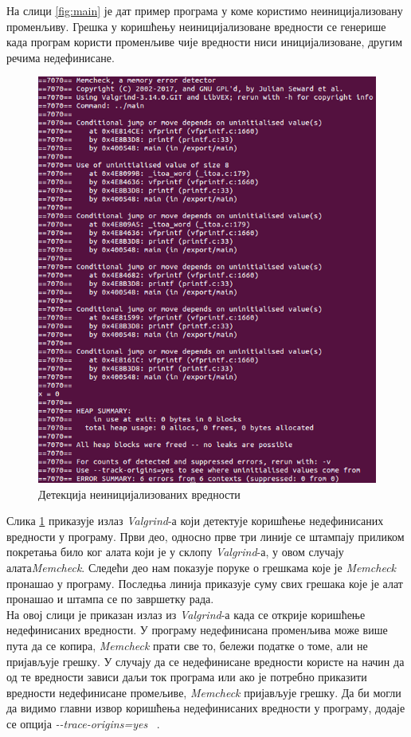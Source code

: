 \documentclass[12pt,oneside]{memoir}
\begin{document}
\indent На слици \ref{fig:main} је дат пример програма у коме користимо неиницијализовану променљиву. Грешка у коришћењу неиницијализоване вредности се генерише када програм користи променљиве чије вредности ниси иницијализоване, другим речима недефинисане.

\begin{figure}[h!]
\begin{center}
\includegraphics[scale=0.75]{slika2.png}
\end{center}
\caption{Детекција неиницијализованих вредности}
\label{fig:memcheck}
\end{figure}

\indent Слика \ref{fig:memcheck} приказује излаз \textit{Valgrind}-а који детектује коришћење недефинисаних вредности у програму. Први део, односно прве три линије се штампају приликом покретања било ког алата који је у склопу \textit{Valgrind}-а, у овом случају алата\textit{Memcheck}. Следећи део нам показује поруке о грешкама које је \textit{Memcheck} пронашао у програму. Последња линија приказује суму свих грешака које је алат пронашао и штампа се по завршетку рада. \\
\indent На овој слици је приказан излаз из \textit{Valgrind}-а када се открије  коришћење недефинисаних вредности. У програму недефинисана променљива може више пута да се копира, \textit{Memcheck} прати све то, бележи податке о томе, али не пријављује грешку. У случају да се недефинисане вредности користе на начин да од те вредности зависи даљи ток програма или ако је потребно приказити вредности недефинисане промељиве, \textit{Memcheck} пријављује грешку. Да би могли да видимо главни извор коришћења недефинисаних вредности у програму, додаје се опција \textit{-\--trace-origins=yes} ~\cite{memcheckRef}.
\end{document}
